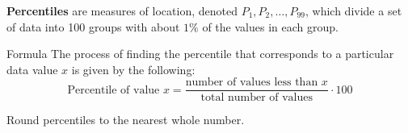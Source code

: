 \documentclass[handout]{beamer}
\begin{document}
\begin{frame}
\begin{definition}
\textbf{Percentiles} are measures of location, denoted $P_{1},P_{2},\ldots,P_{99}$, which divide a set of data into 100 groups with about $1\%$ of the values in each group.
\end{definition}\pause

\begin{block}{Formula}
The process of finding the percentile that corresponds to a particular data value $x$ is given by the following:
\begin{equation*}
\text{Percentile of value $x$} = \dfrac{\text{number of values less than $x$}}{\text{total number of values}}\cdot 100
\end{equation*}
\end{block}\pause

\begin{note}
Round percentiles to the nearest whole number.
\end{note}
\end{frame}
\end{document}
